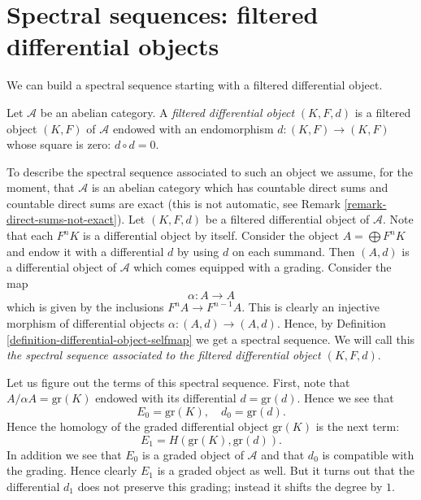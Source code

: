 \section{Spectral sequences: filtered differential objects}
\label{section-filtered-differential}

\noindent
We can build a spectral sequence starting with a filtered
differential object.

\begin{definition}
\label{definition-filtered-differential}
Let $\mathcal{A}$ be an abelian category.
A {\it filtered differential object} $(K, F, d)$ is a filtered object
$(K, F)$ of $\mathcal{A}$ endowed with an endomorphism
$d : (K, F) \to (K, F)$ whose square is zero: $d \circ d = 0$.
\end{definition}

\noindent
To describe the spectral sequence associated to such an object
we assume, for the moment, that $\mathcal{A}$ is an abelian category
which has countable direct sums and countable direct sums are exact
(this is not automatic, see Remark \ref{remark-direct-sums-not-exact}).
Let $(K, F, d)$ be a filtered differential object of $\mathcal{A}$.
Note that each $F^nK$ is a differential object by itself.
Consider the object $A = \bigoplus F^nK$ and endow it with a
differential $d$ by using $d$ on each summand.
Then $(A, d)$ is a differential object of $\mathcal{A}$
which comes equipped with a grading. Consider the map
$$
\alpha : A \to A
$$
which is given by the inclusions $F^nA \to F^{n - 1}A$.
This is clearly an injective morphism of differential objects
$\alpha : (A, d) \to (A, d)$. Hence, by
Definition \ref{definition-differential-object-selfmap}
we get a spectral sequence.
We will call this {\it the spectral sequence associated to
the filtered differential object $(K, F, d)$}.

\medskip\noindent
Let us figure out the terms of this spectral sequence.
First, note that $A/\alpha A = \text{gr}(K)$
endowed with its differential $d = \text{gr}(d)$. Hence we see that
$$
E_0 = \text{gr}(K), \quad d_0 = \text{gr}(d).
$$
Hence the homology of the graded differential object $\text{gr}(K)$
is the next term:
$$
E_1 = H(\text{gr}(K), \text{gr}(d)).
$$
In addition we see that $E_0$ is a graded object of $\mathcal{A}$
and that $d_0$ is compatible with the grading. Hence clearly $E_1$
is a graded object as well. But it turns out that the differential
$d_1$ does not preserve this grading; instead it shifts the degree by $1$.


